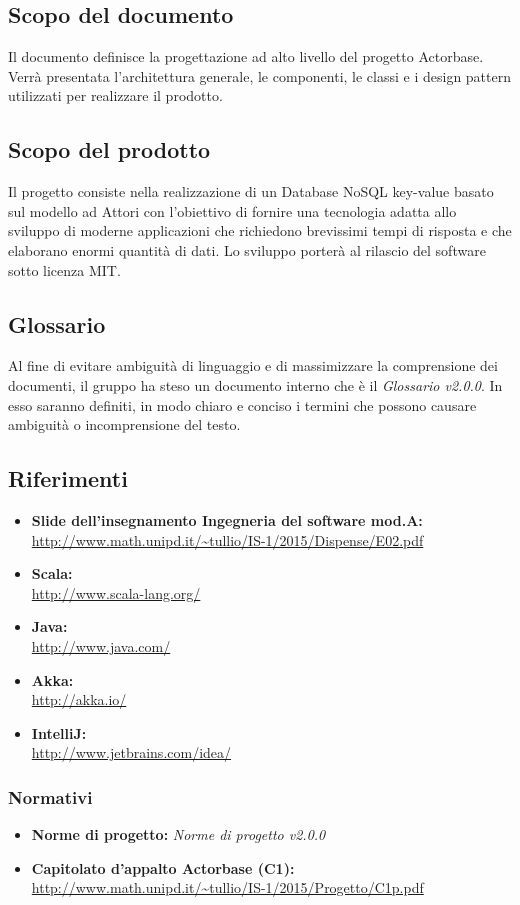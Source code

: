 \documentclass[a4paper]{article}
\begin{document}
	\subsection{Scopo del documento}
		Il documento definisce la progettazione ad alto livello del progetto Actorbase.
		Verrà presentata l'architettura generale, le componenti, le classi e i design pattern utilizzati per realizzare il prodotto.
	\subsection{Scopo del prodotto}
		Il progetto consiste nella realizzazione di un Database NoSQL key-value basato sul modello ad 
		Attori con l'obiettivo di fornire una tecnologia adatta allo sviluppo di moderne 
		applicazioni che richiedono brevissimi tempi di risposta e che elaborano enormi quantità 
		di dati. Lo sviluppo porterà al rilascio del software sotto licenza MIT.
	\subsection{Glossario}
		Al fine di evitare ambiguità di linguaggio e di massimizzare la comprensione dei documenti, il 
      gruppo ha steso un documento interno che è il \emph{Glossario v2.0.0}. In esso saranno definiti, in modo
      chiaro e conciso i termini che possono causare ambiguità o incomprensione del testo.
	\subsection{Riferimenti}
		\begin{itemize}
			\item \textbf{Slide dell'insegnamento Ingegneria del software mod.A:} \\
			\url{http://www.math.unipd.it/~tullio/IS-1/2015/Dispense/E02.pdf}
			\item \textbf{Scala:} \\
			\url{http://www.scala-lang.org/}
			\item \textbf{Java:} \\
			\url{http://www.java.com/}
			\item \textbf{Akka:} \\
			\url{http://akka.io/}
			\item \textbf{IntelliJ:} \\
			\url{http://www.jetbrains.com/idea/}
		\end{itemize}
	\subsubsection{Normativi}
		\begin{itemize}
			\item \textbf{Norme di progetto:} \emph{Norme di progetto v2.0.0}
			\item \textbf{Capitolato d'appalto Actorbase (C1):} \\ 
			\url{http://www.math.unipd.it/~tullio/IS-1/2015/Progetto/C1p.pdf}
		\end{itemize}
		
\end{document}
